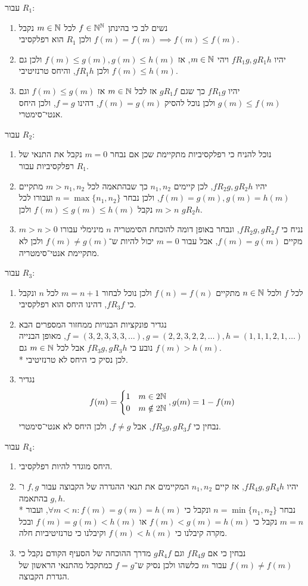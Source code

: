 עבור $R_1$:
\begin{enumerate}
	\item נשים לב כי בהינתן $f \in \mathbb{N}^{\mathbb{N}}$ לכל $m \in \mathbb{N}$ נקבל $f(m) = f(m) \implies f(m) \le f(m)$ ולכן $R_1$ הוא רפלקסיבי.
	\item יהיו $f R_1 g, g R_1 h$ ויהי $m \in \mathbb{N}$, אז $f(m) \le g(m), g(m) \le h(m)$ ולכן גם $f(m) \le h(m)$ ולכן $f R_1 h$, והיחס טרנזיטיבי.
	\item יהיו $f R_1 g$ כך שגם $g R_1 f$ אז לכל $m \in \mathbb{N}$ אז $f(m) \le g(m)$ וגם $g(m) \le f(m)$ ולכן נוכל להסיק $f(m) = g(m)$, דהינו $f = g$, ולכן היחס אנטי־סימטרי.
\end{enumerate}
עבור $R_2$:
\begin{enumerate}
	\item נוכל להניח כי רפלקסיביות מתקיימת שכן אם נבחר $m = 0$ נקבל את התנאי של רפלקסיביות עבור $R_1$.
	\item יהיו $f R_2 g, g R_2 h$, לכן קיימים $n_1, n_2$ כך שבהתאמה לכל $m > n_1, n_2$ מתקיים $f(m) = g(m), g(m) = h(m)$, ולכן נבחר $n = \max\{n_1, n_2\}$ ועבורו לכל $m > n$ נקבל $f(m) \le g(m) \le h(m)$ ולכן $g R_2 h$.
	\item נניח כי $f R_2 g, g R_2 f$, ונבחר באופן דומה להוכחת הסימטריה $n$ מינימלי עבורו $m > n > 0$ מקיים $f(m) = g(m)$, אבל עבור $m = 0$ יכול להיות ש־$f(m) \ne g(m)$ ולכן לא מתקיימת אנטי־סימטריה.
\end{enumerate}
עבור $R_3$:
\begin{enumerate}
	\item לכל $f$ ולכל $n \in \mathbb{N}$ מתקיים $f(n) = f(n)$ ולכן נוכל לבחור $m = n + 1$ לכל $n$ ונקבל כי $f R_3 f$, דהינו היחס הוא רפלקסיבי.
	\item נגדיר פונקציות הבנויות ממחזור המספרים הבא $f = (3, 2, 3, 3, 3, \dots), g = (2, 2, 3, 2, 2, \dots), h = (1, 1, 1, 2, 1, \dots)$, מאופן הבנייה נובע כי $f R_3 g, g R_3 h$ אבל לכל $m \in \mathbb{N}$ גם $f(m) > h(m)$. \\*
		לכן נסיק כי היחס לא טרנזיטיבי.
	\item נגדיר
		\[
			f(m) = \begin{cases}
				1 & m \in 2\mathbb{N} \\
				0 & m \notin 2\mathbb{N}
			\end{cases},
			g(m) = 1 - f(m)
		\]
		נבחין כי $f R_3 g, g R_3 f$, אבל $f \ne g$, ולכן היחס לא אנטי־סימטרי.
\end{enumerate}
עבור $R_4$:
\begin{enumerate}
	\item היחס מוגדר להיות רפלקסיבי.
	\item יהיו $f R_4 g, g R_4 h$, אז קיים $n_1, n_2$ המקיימים את תנאי ההגדרה של הקבוצה עבור $f, g$ ו־$g, h$ בהתאמה. \\*
		נבחר $n = \min\{ n_1, n_2 \}$ ונקבל כי $\forall m < n : f(m) = g(m) = h(m)$, ועבור $m = n$ נקבל כי $f(m) < g(m) = h(m)$ או $f(m) = g(m) < h(m)$ ובכל מקרה קיבלנו כי $f(m) < h(m)$ וקיבלנו כי טרנזיטיביות חלה.
	\item נבחין כי אם $f R_4 g$ וגם $g R_4 f$ מדרך ההוכחה של הסעיף הקודם נקבל כי $f(m) \ne f(m)$ עבור $m$ כלשהו ולכן נסיק ש־$f = g$ כמתקבל מהתנאי הראשון של הגדרת הקבוצה.
\end{enumerate}

